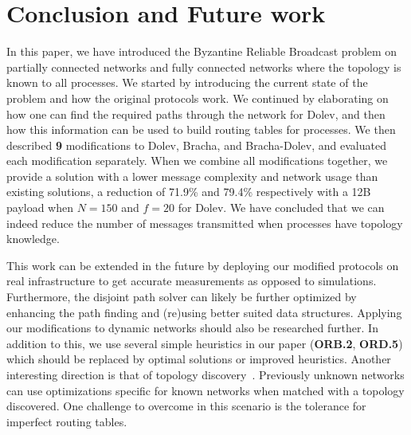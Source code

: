 \section{Conclusion and Future work}
\label{conclusion}


In this paper, we have introduced the Byzantine Reliable Broadcast problem on partially connected networks and fully connected networks where the topology is known to all processes. We started by introducing the current state of the problem and how the original protocols work. We continued by elaborating on how one can find the required paths through the network for Dolev, and then how this information can be used to build routing tables for processes. We then described \textbf{9} modifications to Dolev, Bracha, and Bracha-Dolev, and evaluated each modification separately. When we combine all modifications together, we provide a solution with a lower message complexity and network usage than existing solutions, a reduction of 71.9\% and 79.4\% respectively with a 12B payload when $N=150$ and $f=20$ for Dolev.
We have concluded that we can indeed reduce the number of messages transmitted when processes have topology knowledge.

This work can be extended in the future by deploying our modified protocols on real infrastructure to get accurate measurements as opposed to simulations. Furthermore, the disjoint path solver can likely be further optimized by enhancing the path finding and (re)using better suited data structures. Applying our modifications to dynamic networks should also be researched further. In addition to this, we use several simple heuristics in our paper (\textbf{ORB.2}, \textbf{ORD.5}) which should be replaced by optimal solutions or improved heuristics. Another interesting direction is that of topology discovery~\cite{topology-discovery,explorer,explorer2}. Previously unknown networks can use optimizations specific for known networks when matched with a topology discovered. One challenge to overcome in this scenario is the tolerance for imperfect routing tables.


